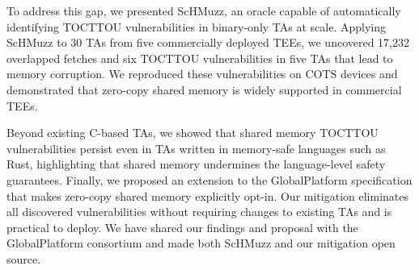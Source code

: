 \documentclass[letterpaper,twocolumn,10pt]{article}
\newcommand{\sysname}{ScHMuzz\xspace}
\newcommand{\optee}{OP-TEE\xspace}
\newcommand{\numTAs}{66\xspace}
\newcommand{\numTAsharnessed}{30\xspace}
\newcommand{\numTEEs}{five\xspace}
\newcommand{\numdfsmerge}{17,232\xspace}
\newcommand{\numvulns}{six\xspace}
\newcommand{\numvulnTAs}{five\xspace}
\begin{document}
To address this gap, we presented \sysname, an oracle capable of automatically 
identifying TOCTTOU vulnerabilities in binary-only TAs at scale. Applying \sysname 
to \numTAsharnessed{} TAs from \numTEEs{} commercially deployed TEEs, we uncovered 
\numdfsmerge{} overlapped fetches and \numvulns{} TOCTTOU vulnerabilities in \numvulnTAs{} TAs that 
lead to memory corruption. We reproduced these vulnerabilities on COTS 
devices and demonstrated that zero-copy shared memory is widely supported in commercial TEEs.
 
Beyond existing C-based TAs, we showed that shared memory TOCTTOU vulnerabilities persist even in 
TAs written in memory-safe languages such as Rust, highlighting that shared memory undermines 
the language-level safety guarantees. Finally, we proposed an extension 
to the GlobalPlatform specification that makes zero-copy shared memory explicitly opt-in. 
Our mitigation eliminates all discovered vulnerabilities without requiring changes to existing 
TAs and is practical to deploy. We have shared our findings and proposal with the GlobalPlatform 
consortium and made both \sysname and our mitigation open source.

%
 
\end{document}
